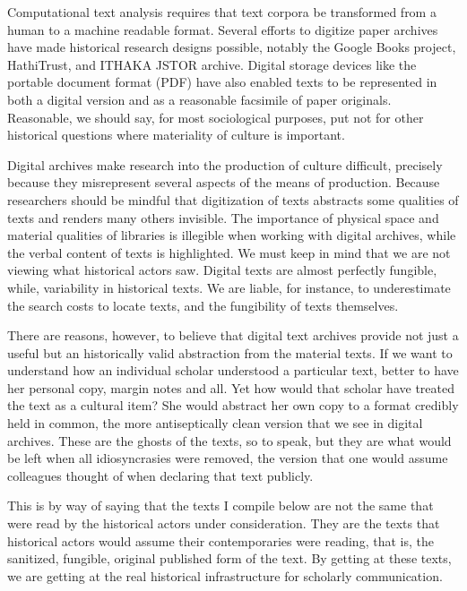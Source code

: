 \documentclass[]{book}
\theoremstyle{definition}
\theoremstyle{definition}
\theoremstyle{definition}
\theoremstyle{remark}
\begin{document}
Computational text analysis requires that text corpora be transformed
from a human to a machine readable format. Several efforts to digitize
paper archives have made historical research designs possible, notably
the Google Books project, HathiTrust, and ITHAKA JSTOR archive. Digital
storage devices like the portable document format (PDF) have also
enabled texts to be represented in both a digital version and as a
reasonable facsimile of paper originals. Reasonable, we should say, for
most sociological purposes, put not for other historical questions where
materiality of culture is important.
\citep[149]{Schreibman2014NonConsumptive}

Digital archives make research into the production of culture difficult,
precisely because they misrepresent several aspects of the means of
production. Because researchers should be mindful that digitization of
texts abstracts some qualities of texts and renders many others
invisible. The importance of physical space and material qualities of
libraries is illegible when working with digital archives, while the
verbal content of texts is highlighted. We must keep in mind that we are
not viewing what historical actors saw. Digital texts are almost
perfectly fungible, while, variability in historical texts. We are
liable, for instance, to underestimate the search costs to locate texts,
and the fungibility of texts themselves.

There are reasons, however, to believe that digital text archives
provide not just a useful but an historically valid abstraction from the
material texts. If we want to understand how an individual scholar
understood a particular text, better to have her personal copy, margin
notes and all. Yet how would that scholar have treated the text as a
cultural item? She would abstract her own copy to a format credibly held
in common, the more antiseptically clean version that we see in digital
archives. These are the ghosts of the texts, so to speak, but they are
what would be left when all idiosyncrasies were removed, the version
that one would assume colleagues thought of when declaring that text
publicly.

This is by way of saying that the texts I compile below are not the same
that were read by the historical actors under consideration. They are
the texts that historical actors would assume their contemporaries were
reading, that is, the sanitized, fungible, original published form of
the text. By getting at these texts, we are getting at the real
historical infrastructure for scholarly communication.
\end{document}
